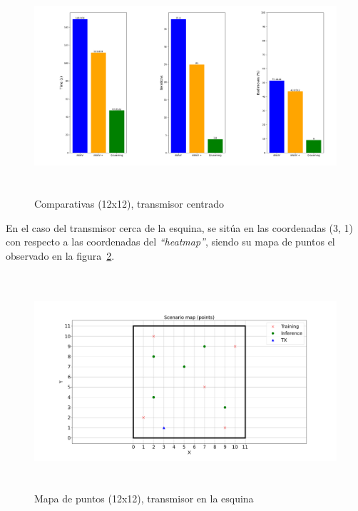 \begin{figure} [t]
    \begin{center}
    \includegraphics[height=8cm]{imagenes/cap4/18_comp_centro_12.png}
    \end{center}
    \caption[Comparativas (12x12), transmisor centrado]{Comparativas (12x12), transmisor centrado}
    \label{fig:comp_center_12}
\end{figure}

En el caso del transmisor cerca de la esquina, se sitúa en las coordenadas (3, 1) con respecto a las coordenadas del \emph{``heatmap''}, siendo su mapa de puntos el observado en la figura~\ref{fig:map_p_esq_12}.\\

\begin{figure} [t]
    \begin{center}
    \includegraphics[height=8cm]{imagenes/cap4/19_mapa_p_esq_12.png}
    \end{center}
    \caption[Mapa de puntos (12x12), transmisor en la esquina]{Mapa de puntos (12x12), transmisor en la esquina}
    \label{fig:map_p_esq_12}
\end{figure}

